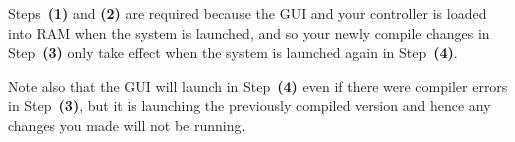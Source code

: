 \documentclass[]{report}
\begin{document}
	\vspace{0.3cm}
	
	\noindent
	Steps~\textbf{(1)} and \textbf{(2)} are required because the GUI and your controller is loaded into RAM when the system is launched, and so your newly compile changes in Step~\textbf{(3)} only take effect when the system is launched again in Step~\textbf{(4)}.
	
	\vspace{0.3cm}
	
	\noindent
	Note also that the GUI will launch in Step~\textbf{(4)} even if there were compiler errors in Step~\textbf{(3)}, but it is launching the previously compiled version and hence any changes you made will not be running.
	
\end{document}

